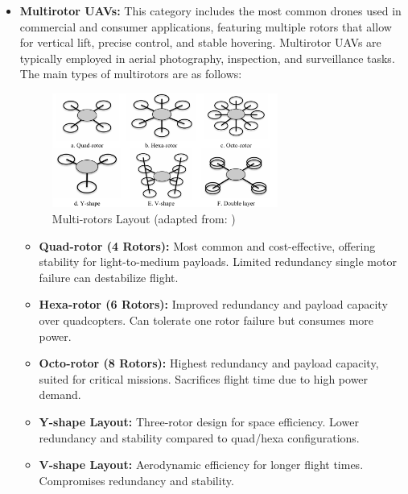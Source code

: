 \begin{itemize}
    \item \textbf{Multirotor UAVs:} This category includes the most common drones used in commercial and consumer applications, featuring multiple rotors that allow for vertical lift, precise control, and stable hovering. Multirotor UAVs are typically employed in aerial photography, inspection, and surveillance tasks. The main types of multirotors are as follows:

    \begin{figure}[H]  %
        \centering
        \includegraphics[width=0.7\textwidth]{Figures/Chapter1/Section1/2.png} %
        \caption{  Multi-rotors Layout  (adapted from: \cite{chen2016state})}
        \label{fig:method3_architecture} %
    \end{figure}
    
\begin{itemize}
    \item \textbf{Quad-rotor (4 Rotors):} Most common and cost-effective, offering stability for light-to-medium payloads. Limited redundancy single motor failure can destabilize flight. \cite{idk}
    
    \item \textbf{Hexa-rotor (6 Rotors):} Improved redundancy and payload capacity over quadcopters. Can tolerate one rotor failure but consumes more power. \cite{idk}
    
    \item \textbf{Octo-rotor (8 Rotors):} Highest redundancy and payload capacity, suited for critical missions. Sacrifices flight time due to high power demand. \cite{idk}
    
    \item \textbf{Y-shape Layout:} Three-rotor design for space efficiency. Lower redundancy and stability compared to quad/hexa configurations. \cite{idk}
    
    \item \textbf{V-shape Layout:} Aerodynamic efficiency for longer flight times. Compromises redundancy and stability. \cite{idk}
    

\end{itemize}
\end{itemize}
